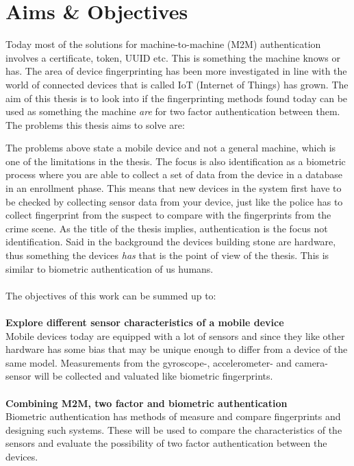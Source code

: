 \section{Aims \& Objectives}\label{sec:aim}
Today most of the solutions for machine-to-machine (M2M) authentication involves a certificate, token, UUID etc. This is something the machine knows or has. The area of device fingerprinting has been more investigated in line with the world of connected devices that is called IoT (Internet of Things) has grown. The aim of this thesis is to look into if the fingerprinting methods found today can be used as something the machine \textit{are} for two factor authentication between them. The problems this thesis aims to solve are:
The problems above state a mobile device and not a general machine, which is one of the limitations in the thesis. The focus is also identification as a biometric process where you are able to collect a set of data from the device in a database in an enrollment phase. This means that new devices in the system first have to be checked by collecting sensor data from your device, just like the police has to collect fingerprint from the suspect to compare with the fingerprints from the crime scene. As the title of the thesis implies, authentication is the focus not identification. Said in the background the devices building stone are hardware, thus something the devices \textit{has} that is the point of view of the thesis. This is similar to biometric authentication of us humans. \\
\\
The objectives of this work can be summed up to:\\
\\
\textbf{Explore different sensor characteristics of a mobile device} \\
Mobile devices today are equipped with a lot of sensors and since they like other hardware has some bias that may be unique enough to differ from a device of the same model. Measurements from the gyroscope-, accelerometer- and camera-sensor will be collected and valuated like biometric fingerprints.\\
\\
\textbf{Combining M2M, two factor and biometric authentication} \\
Biometric authentication has methods of measure and compare fingerprints and designing such systems. These will be used to compare the characteristics of the sensors and evaluate the possibility of two factor authentication between the devices.

